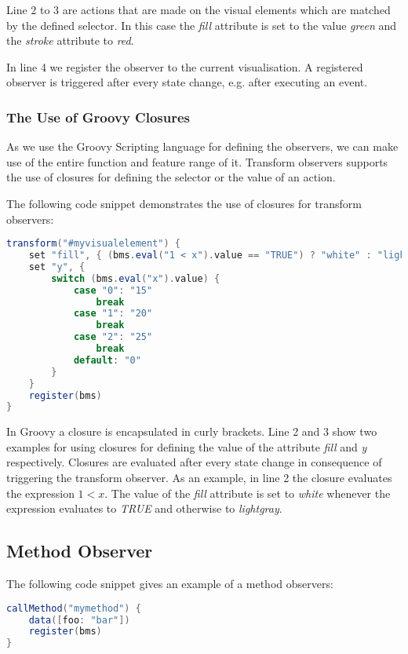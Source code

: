 Line 2 to 3 are actions that are made on the visual elements which are matched by the defined selector.
In this case the \textit{fill} attribute is set to the value \textit{green} and the \textit{stroke} attribute to \textit{red}.

In line 4 we register the observer to the current visualisation.
A registered observer is triggered after every state change, e.g. after executing an event.

\subsubsection{The Use of Groovy Closures}

As we use the Groovy Scripting language for defining the observers, we can make use of the entire function and feature range of it.
Transform observers supports the use of closures for defining the selector or the value of an action.

The following code snippet demonstrates the use of closures for transform observers:

\begin{lstlisting}[float=ht,language=Groovy]
transform("#myvisualelement") {
    set "fill", { (bms.eval("1 < x").value == "TRUE") ? "white" : "lightgray" }
    set "y", {
        switch (bms.eval("x").value) {
            case "0": "15"
                break
            case "1": "20"
                break
            case "2": "25"
                break
            default: "0"
        }
    }
    register(bms)
}
\end{lstlisting}

In Groovy a closure is encapsulated in curly brackets.
Line 2 and 3 show two examples for using closures for defining the value of the attribute \textit{fill} and \textit{y} respectively.
Closures are evaluated after every state change in consequence of triggering the transform observer.
As an example, in line 2 the closure evaluates the expression $1 < x$.
The value of the \textit{fill} attribute is set to \textit{white} whenever the expression evaluates to \textit{TRUE} and otherwise to \textit{lightgray}.


\subsection{Method Observer}
\label{sec:method_observer}

The following code snippet gives an example of a method observers:

\begin{lstlisting}[float=ht,language=Groovy]
callMethod("mymethod") {
    data([foo: "bar"])
    register(bms)
}
\end{lstlisting}

